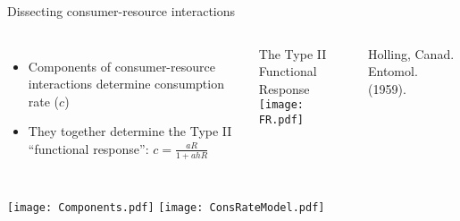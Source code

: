   \begin{frame}{Dissecting consumer-resource interactions}
  
  \begin{columns}[c]
    \begin{itemize}
      \item Components of consumer-resource interactions determine consumption rate ($c$)
      \item They together determine the Type II  ``functional response'': $c = \frac{aR}{1+ahR}$
    \end{itemize}
    \pause
     \centering
      {\tiny The Type II Functional Response}\\
      \vspace{2pt}
      \texttt{[image: FR.pdf]}\\
      {\tiny Holling, Canad. Entomol. (1959).\par}
  \end{columns}

  \vspace{16pt}

  \begin{columns}[c]
  \centering\itemsep3pt
    \texttt{[image: Components.pdf]}
  	\centering
    \texttt{[image: ConsRateModel.pdf]}
  \end{columns}

  \end{frame}
  
